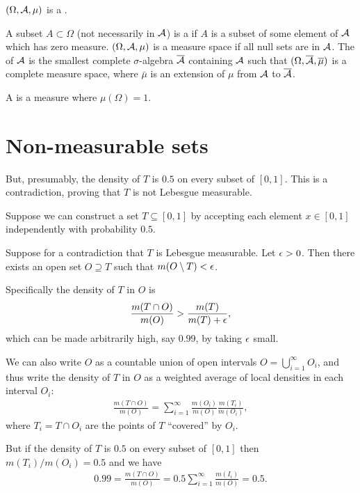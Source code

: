 $(\Omega, \mathcal A, \mu)$ is a .

A subset $A \subset \Omega$ (not necessarily in $\mathcal A$) is a  if $A$ is a subset of some element
of $\mathcal A$ which has zero measure. $(\Omega, \mathcal A, \mu)$ is a  measure space if all null sets are
in $\mathcal A$. The  of $\mathcal A$ is the smallest complete $\sigma$-algebra $\overline{\mathcal A}$ containing
$\mathcal A$ such that $(\Omega, \overline{\mathcal A}, \overline \mu)$ is a complete measure space, where $\bar \mu$ is an
extension of $\mu$ from $\mathcal A$ to $\overline{\mathcal A}$.

A  is a measure where $\mu(\Omega) = 1$.

\section{Non-measurable sets}

But, presumably, the density of $T$ is $0.5$ on every subset of $[0, 1]$. This is a contradiction, proving
that $T$ is not Lebesgue measurable.

\newpage
\begin{example}

  Suppose we can construct a set $T \subseteq [0, 1]$ by accepting each element $x \in [0, 1]$ independently
  with probability $0.5$.

  Suppose for a contradiction that $T$ is Lebesgue measurable. Let $\epsilon > 0$. Then there exists an open
  set $O \supseteq T$ such that $m(O \setminus T) < \epsilon$.

  Specifically the density of $T$ in $O$ is
  \begin{align*}
    \frac{m(T \cap O)}{m(O)} > \frac{m(T)}{m(T) + \epsilon},
  \end{align*}
  which can be made arbitrarily high, say 0.99, by taking $\epsilon$ small.

  We can also write $O$ as a countable union of open intervals $O = \bigcup_{i=1}^\infty O_i$, and thus write
  the density of $T$ in $O$ as a weighted average of local densities in each interval $O_i$:
  \begin{align*}
    \frac{m(T \cap O)}{m(O)} = \sum_{i=1}^\infty \frac{m(O_i)}{m(O)} \frac{m(T_i)}{m(O_i)},
  \end{align*}
  where $T_i = T \cap O_i$ are the points of $T$ ``covered​'' by $O_i$.

  But if the density of $T$ is $0.5$ on every subset of $[0, 1]$ then $m(T_i)/m(O_i) = 0.5$ and we have
  \begin{align*}
    0.99 = \frac{m(T \cap O)}{m(O)} = 0.5\sum_{i=1}^\infty \frac{m(I_i)}{m(O)} = 0.5.
  \end{align*}
\end{example}


